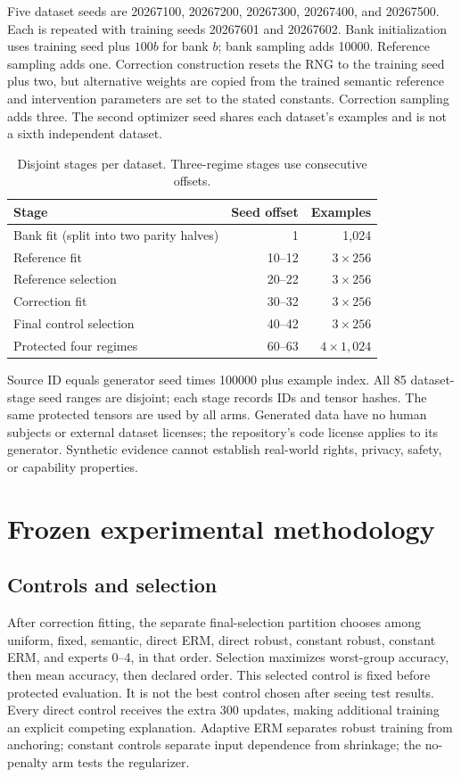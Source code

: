 Five dataset seeds are 20267100, 20267200, 20267300, 20267400, and 20267500.
Each is repeated with training seeds 20267601 and 20267602. Bank initialization
uses training seed plus $100b$ for bank $b$; bank sampling adds 10000.
Reference sampling adds one. Correction construction resets the RNG to the
training seed plus two, but alternative weights are copied from the trained
semantic reference and intervention parameters are set to the stated constants.
Correction sampling adds three. The second optimizer seed shares each dataset's examples
and is not a sixth independent dataset.

\begin{table}[ht]
\centering
\caption{Disjoint stages per dataset. Three-regime stages use consecutive offsets.}
\begin{tabular}{lrr}
\toprule Stage & Seed offset & Examples \\\midrule
Bank fit (split into two parity halves) & 1 & 1,024 \\
Reference fit & 10--12 & $3\times256$ \\
Reference selection & 20--22 & $3\times256$ \\
Correction fit & 30--32 & $3\times256$ \\
Final control selection & 40--42 & $3\times256$ \\
Protected four regimes & 60--63 & $4\times1,024$ \\\bottomrule
\end{tabular}
\end{table}
Source ID equals generator seed times 100000 plus example index. All 85
dataset-stage seed ranges are disjoint; each stage records IDs and tensor
hashes. The same protected tensors are used by all arms. Generated data have no
human subjects or external dataset licenses; the repository's code license
applies to its generator. Synthetic evidence cannot establish real-world rights,
privacy, safety, or capability properties.

\section{Frozen experimental methodology}
\subsection{Controls and selection}
After correction fitting, the separate final-selection partition chooses among
uniform, fixed, semantic, direct ERM, direct robust, constant robust, constant
ERM, and experts 0--4, in that order. Selection maximizes worst-group accuracy,
then mean accuracy, then declared order. This selected control is fixed before
protected evaluation. It is not the best control chosen after seeing test
results. Every direct control receives the extra 300 updates, making additional
training an explicit competing explanation. Adaptive ERM separates robust
training from anchoring; constant controls separate input dependence from
shrinkage; the no-penalty arm tests the regularizer.

